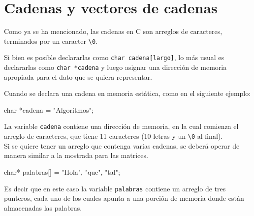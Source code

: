 \section{Cadenas y vectores de cadenas}

Como ya se ha mencionado, las cadenas en C son arreglos de caracteres,
terminados por un caracter \lstinline!\0!.

Si bien es posible declararlas como \lstinline!char cadena[largo]!, lo más
usual es declararlas como \lstinline!char *cadena! y luego asignar una
dirección de memoria apropiada para el dato que se quiera representar.

Cuando se declara una cadena en memoria estática, como en el siguiente
ejemplo:

\begin{codigo-c-plano}
char *cadena = "Algoritmos";
\end{codigo-c-plano}

La variable \lstinline!cadena! contiene una dirección de memoria, en la
cual comienza el arreglo de caracteres, que tiene 11 caracteres (10 letras
y un \lstinline!\0! al final). \\

Si se quiere tener un arreglo que contenga varias cadenas, se deberá operar
de manera similar a la mostrada para las matrices.

\begin{codigo-c-plano}
    char* palabras[] = {"Hola", "que", "tal"};
\end{codigo-c-plano}

Es decir que en este caso la variable \lstinline!palabras! contiene un
arreglo de tres punteros, cada uno de los cuales apunta a una porción de
memoria donde están almacenadas las palabras.

